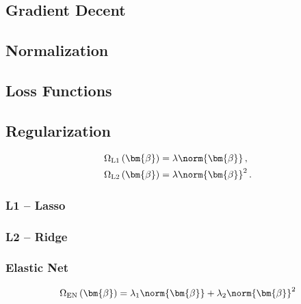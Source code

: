 \subsection{Gradient Decent}
\label{ml:general:gradDec}

\subsection{Normalization}
\label{ml:general:normalization}

\subsection{Loss Functions}
\label{ml:general:loss_Func}

\subsection{Regularization}
\label{ml:general:reg}

\begin{subequations} \label{eq:L1_L2}
\begin{align}
\Omega_{\text{L1}}\left(\bm{\beta}\right) &= \lambda \norm{\bm{\beta}}\,,     \label{eq:L1} \\
\Omega_{\text{L2}}\left(\bm{\beta}\right) &= \lambda \norm{\bm{\beta}}^{2}\,. \label{eq:L2}
\end{align}
\end{subequations}

\subsubsection{L1 -- Lasso}
\label{ml:general:reg:L1}

\subsubsection{L2 -- Ridge}
\label{ml:general:reg:L2}

\subsubsection{Elastic Net}
\label{ml:general:reg:EN}

\begin{equation} \label{eq:elastic_net}
\Omega_{\text{EN}}\left(\bm{\beta}\right) = \lambda_{1} \norm{\bm{\beta}} + \lambda_{2} \norm{\bm{\beta}}^{2}
\end{equation}

